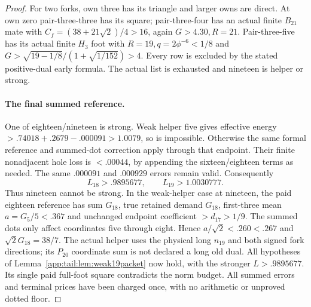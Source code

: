\documentclass[11pt]{article}
\theoremstyle{definition}
\theoremstyle{remark}
\begin{document}
\begin{proof}
For two forks, own three has its triangle and larger owns are direct.
At own zero pair-three-three has its square; pair-three-four has
an actual finite $B_{21}$ mate with
$C_f=(38+21\sqrt2)/4>16$, again $G>4.30,R=21$.
Pair-three-five has its actual finite $H_3$ foot with
$R=19,q=2\phi^{-6}<1/8$ and
$G>\sqrt{19-1/8}/(1+\sqrt{1/152})>4$.
Every row is excluded by the stated positive-dual early formula.
The actual list is exhausted and nineteen is helper or strong.

\paragraph{The final summed reference.}
One of eighteen/nineteen is strong. Weak helper five gives effective
energy $>.74018+.2679-.000091>1.0079$, so is impossible.
Otherwise the same formal reference and summed-dot correction apply
through that endpoint. Their finite nonadjacent hole loss is
$<.00044$, by appending the sixteen/eighteen terms as needed.
The same $.000091$ and $.000929$ errors remain valid. Consequently
\[
 L_{18}>.9895677,\qquad L_{19}>1.0030777.
\]
Thus nineteen cannot be strong. In the weak-helper case at nineteen,
the paid eighteen reference has sum $G_{18}$, true retained demand
$G_{18}$, first-three mean $a=G_5/5<.367$ and unchanged endpoint
coefficient $>d_{17}>1/9$. The summed dots only affect coordinates
five through eight. Hence $a/\sqrt2<.260<.267$ and
$\sqrt2G_{18}=38/7$. The actual helper uses the physical long
$n_{19}$ and both signed fork directions; its $P_{20}$ coordinate
sum is not declared a long old dual.
All hypotheses of Lemma~\ref{app:tail:lem:weak19packet} now hold,
with the stronger $L>.9895677$. Its single paid full-foot square
contradicts the norm budget. All summed errors and terminal prices
have been charged once, with no arithmetic or unproved dotted floor.
\end{proof}
\end{document}
